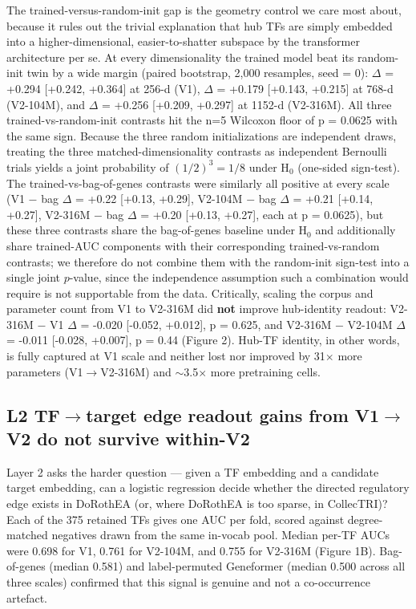 \documentclass[
  11pt,
]{article}
\begin{document}
The trained-versus-random-init gap is the geometry control we care most
about, because it rules out the trivial explanation that hub TFs are
simply embedded into a higher-dimensional, easier-to-shatter subspace by
the transformer architecture per se. At every dimensionality the trained
model beat its random-init twin by a wide margin (paired bootstrap, 2,000 resamples, seed = 0): $\Delta$ = +0.294 {[}+0.242, +0.364{]} at 256-d (V1),
$\Delta$ = +0.179 {[}+0.143, +0.215{]} at 768-d (V2-104M),
and $\Delta$ = +0.256 {[}+0.209, +0.297{]} at 1152-d (V2-316M). All three
trained-vs-random-init contrasts hit the n=5 Wilcoxon floor of p = 0.0625
with the same sign. Because the three random initializations are
independent draws, treating the three matched-dimensionality contrasts as
independent Bernoulli trials yields a joint probability of $(1/2)^3 = 1/8$
under H$_0$ (one-sided sign-test). The trained-vs-bag-of-genes contrasts
were similarly all positive at every scale (V1 $-$ bag $\Delta$ = +0.22 {[}+0.13, +0.29{]},
V2-104M $-$ bag $\Delta$ = +0.21 {[}+0.14, +0.27{]}, V2-316M $-$ bag $\Delta$ = +0.20 {[}+0.13, +0.27{]}, each at p = 0.0625), but these three contrasts share the bag-of-genes baseline under H$_0$ and additionally share trained-AUC components with their corresponding trained-vs-random contrasts; we therefore do not combine them with the random-init sign-test into a single joint $p$-value, since the independence assumption such a combination would require is not supportable from the data. Critically, scaling the corpus
and parameter count from V1 to V2-316M did \textbf{not} improve
hub-identity readout: V2-316M $-$ V1 $\Delta$ = -0.020 {[}-0.052, +0.012{]}, p =
0.625, and V2-316M $-$ V2-104M $\Delta$ = -0.011 {[}-0.028, +0.007{]}, p = 0.44
(Figure 2). Hub-TF identity, in other words, is fully captured at V1
scale and neither lost nor improved by 31$\times$ more parameters (V1$\to$V2-316M) and $\sim$3.5$\times$ more
pretraining cells.

\subsection{L2 TF$\to$target edge readout gains from V1$\to$V2 do not
survive
within-V2}\label{l2-tftarget-edge-readout-gains-from-v1v2-do-not-survive-within-v2}

Layer 2 asks the harder question --- given a TF embedding and a
candidate target embedding, can a logistic regression decide whether the
directed regulatory edge exists in DoRothEA (or, where DoRothEA is too
sparse, in CollecTRI)? Each of the 375 retained TFs gives one AUC per
fold, scored against degree-matched negatives drawn from the same
in-vocab pool. Median per-TF AUCs were 0.698 for V1, 0.761 for V2-104M,
and 0.755 for V2-316M (Figure 1B). Bag-of-genes (median 0.581) and
label-permuted Geneformer (median 0.500 across all three scales)
confirmed that this signal is genuine and not a co-occurrence artefact.
\end{document}
